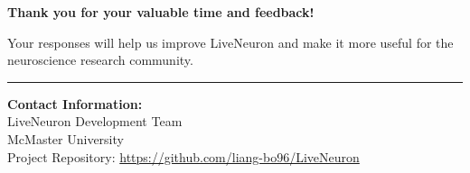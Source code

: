 \documentclass[11pt,a4paper]{article}
\newcommand{\textline}[1]{\underline{\hspace{#1}}}
\begin{document}
\textline{12cm}

\vspace{0.3cm}

\textline{12cm}

\vspace{0.3cm}

\textline{12cm}

\vspace{0.3cm}

\textline{12cm}

\vspace{2cm}

\begin{tcolorbox}[colback=primaryblue!10,colframe=primaryblue,boxrule=1pt,arc=2pt]
    \centering
    \Large\textbf{Thank you for your valuable time and feedback!}
    
    \vspace{0.5cm}
    
    Your responses will help us improve LiveNeuron and make it more useful for the neuroscience research community.
\end{tcolorbox}

\vspace{1cm}

\hrule

\vspace{0.5cm}

\small
\textbf{Contact Information:}\\
LiveNeuron Development Team\\
McMaster University\\
Project Repository: \href{https://github.com/liang-bo96/LiveNeuron}{https://github.com/liang-bo96/LiveNeuron}
\end{document}
